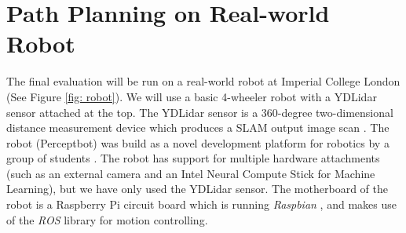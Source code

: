 \FloatBarrier

\section{Path Planning on Real-world Robot}
\label{sec: robotexp}

The final evaluation will be run on a real-world robot at Imperial College London (See Figure \ref{fig: robot}). We will use a basic 4-wheeler robot with a YDLidar sensor attached at the top. The YDLidar sensor is a 360-degree two-dimensional distance measurement device which produces a SLAM output image scan \cite{ydlidar}. The robot (Perceptbot) was build as a novel development platform for robotics by a group of students \cite{robo}. The robot has support for multiple hardware attachments (such as an external camera and an Intel Neural Compute Stick for Machine Learning), but we have only used the YDLidar sensor. The motherboard of the robot is a Raspberry Pi circuit board \cite{Halfacree:2012:RPU:2432381} which is running \textit{Raspbian} \cite{raspbian}, and makes use of the \textit{ROS} library for motion controlling.

